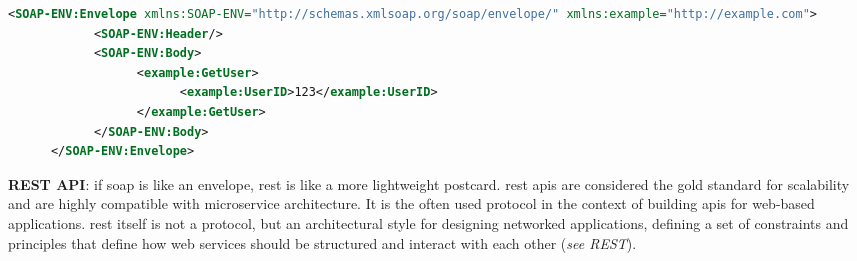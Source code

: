 \begin{lstlisting}[language=XML, caption=Example of a SOAP request, label=lst:soaprequest]
      <SOAP-ENV:Envelope xmlns:SOAP-ENV="http://schemas.xmlsoap.org/soap/envelope/" xmlns:example="http://example.com">
            <SOAP-ENV:Header/>
            <SOAP-ENV:Body>
                  <example:GetUser>
                        <example:UserID>123</example:UserID>
                  </example:GetUser>
            </SOAP-ENV:Body>
      </SOAP-ENV:Envelope>
\end{lstlisting}

\begin{multicols}{2}
      \textbf{REST API}: if \acrshort{soap} is like an envelope, \acrshort{rest} is like a  more lightweight postcard. 
      \acrshort{rest} \acrshort{api}s are considered the gold standard for scalability and are highly compatible with 
      microservice architecture. It is the often used protocol in the context of building \acrshort{api}s for web-based
      applications. \acrshort{rest} itself is not a protocol, but an architectural style for designing networked
      applications, defining a set of constraints and principles that define how web services should be structured
      and interact with each other (\textit{see \gls{REST}}).


\end{multicols}
